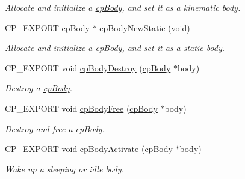 \begin{DoxyCompactItemize}
\begin{DoxyCompactList}\small\item\em Allocate and initialize a \mbox{\hyperlink{structcp_body}{cp\+Body}}, and set it as a kinematic body. \end{DoxyCompactList}\item 
\mbox{\label{group__cp_body_gaea14fca32e4f71bf50a0baf4af82463c}} 
C\+P\+\_\+\+E\+X\+P\+O\+RT \mbox{\hyperlink{structcp_body}{cp\+Body}} $\ast$ \mbox{\hyperlink{group__cp_body_gaea14fca32e4f71bf50a0baf4af82463c}{cp\+Body\+New\+Static}} (void)
\begin{DoxyCompactList}\small\item\em Allocate and initialize a \mbox{\hyperlink{structcp_body}{cp\+Body}}, and set it as a static body. \end{DoxyCompactList}\item 
\mbox{\label{group__cp_body_gad1c5b4732223132e2e6f2cd25adea056}} 
C\+P\+\_\+\+E\+X\+P\+O\+RT void \mbox{\hyperlink{group__cp_body_gad1c5b4732223132e2e6f2cd25adea056}{cp\+Body\+Destroy}} (\mbox{\hyperlink{structcp_body}{cp\+Body}} $\ast$body)
\begin{DoxyCompactList}\small\item\em Destroy a \mbox{\hyperlink{structcp_body}{cp\+Body}}. \end{DoxyCompactList}\item 
\mbox{\label{group__cp_body_gac7189e8502b0583a6bd6633b450fad0d}} 
C\+P\+\_\+\+E\+X\+P\+O\+RT void \mbox{\hyperlink{group__cp_body_gac7189e8502b0583a6bd6633b450fad0d}{cp\+Body\+Free}} (\mbox{\hyperlink{structcp_body}{cp\+Body}} $\ast$body)
\begin{DoxyCompactList}\small\item\em Destroy and free a \mbox{\hyperlink{structcp_body}{cp\+Body}}. \end{DoxyCompactList}\item 
\mbox{\label{group__cp_body_ga23741f9682e268913d9f6f8a72b64cf0}} 
C\+P\+\_\+\+E\+X\+P\+O\+RT void \mbox{\hyperlink{group__cp_body_ga23741f9682e268913d9f6f8a72b64cf0}{cp\+Body\+Activate}} (\mbox{\hyperlink{structcp_body}{cp\+Body}} $\ast$body)
\begin{DoxyCompactList}\small\item\em Wake up a sleeping or idle body. \end{DoxyCompactList}\item 

\end{DoxyCompactItemize}
